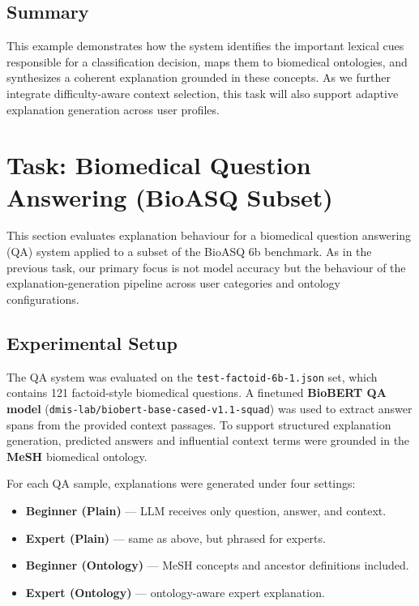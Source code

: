 \subsection*{Summary}

This example demonstrates how the system identifies the important lexical cues responsible for a classification decision, maps them to biomedical ontologies, and synthesizes a coherent explanation grounded in these concepts. As we further integrate difficulty-aware context selection, this task will also support adaptive explanation generation across user profiles.

\section{Task: Biomedical Question Answering (BioASQ Subset)}
\label{sec:bioasq_results}

This section evaluates explanation behaviour for a biomedical question answering (QA) system applied to a subset of the BioASQ 6b benchmark. As in the previous task, our primary focus is not model accuracy but the behaviour of the explanation-generation pipeline across user categories and ontology configurations.

\subsection{Experimental Setup}

The QA system was evaluated on the \texttt{test-factoid-6b-1.json} set, which contains 121 factoid-style biomedical questions.  
A finetuned \textbf{BioBERT QA model} (\texttt{dmis-lab/biobert-base-cased-v1.1-squad}) was used to extract answer spans from the provided context passages. To support structured explanation generation, predicted answers and influential context terms were grounded in the \textbf{MeSH} biomedical ontology.  

For each QA sample, explanations were generated under four settings:

\begin{itemize}
    \item \textbf{Beginner (Plain)} — LLM receives only question, answer, and context.
    \item \textbf{Expert (Plain)} — same as above, but phrased for experts.
    \item \textbf{Beginner (Ontology)} — MeSH concepts and ancestor definitions included.
    \item \textbf{Expert (Ontology)} — ontology-aware expert explanation.
\end{itemize}

